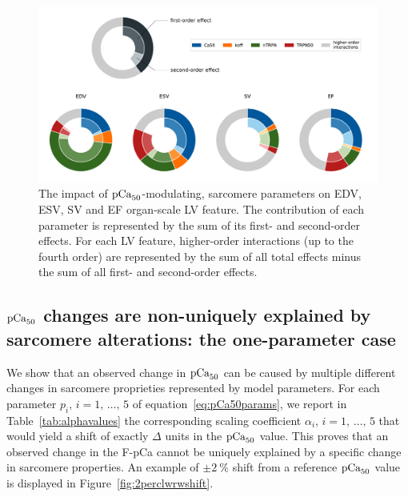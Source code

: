 \begin{figure}[h!]
    \myfloatalign
    \includegraphics[width=\textwidth]{figures/chapter08/Fig3.pdf}
    \caption{The impact of $\textrm{pCa}_{50}$-modulating, sarcomere parameters on EDV, ESV, SV and EF organ-scale LV feature. The contribution of each parameter is represented by the sum of its first- and second-order effects. For each LV feature, higher-order interactions (up to the fourth order) are represented by the sum of all total effects minus the sum of all first- and second-order effects.}
    \label{fig:gsarestr}
\end{figure}


%
%
%
\subsection{$\textrm{pCa}_{50}$ changes are non-uniquely explained by sarcomere alterations: the one-parameter case}\label{sec:changespCa50result1}
We show that an observed change in $\textrm{pCa}_{50}$ can be caused by multiple different changes in sarcomere proprieties represented by model parameters. For each parameter $p_i,\,i=1,\,\dots,\,5$ of equation~\eqref{eq:pCa50params}, we report in Table~\ref{tab:alphavalues} the corresponding scaling coefficient $\alpha_i,\,i=1,\,\dots,\,5$ that would yield a shift of exactly $\Delta$ units in the $\textrm{pCa}_{50}$ value. This proves that an observed change in the F-pCa cannot be uniquely explained by a specific change in sarcomere properties. An example of $\pm\SI{2}{\percent}$ shift from a reference $\textrm{pCa}_{50}$ value is displayed in Figure~\ref{fig:2perclwrwshift}.

